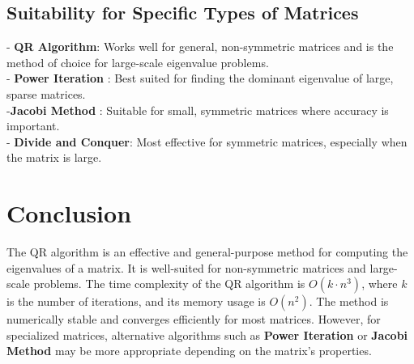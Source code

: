 \documentclass{article}
\begin{document}
\subsection{Suitability for Specific Types of Matrices}
- \textbf{QR Algorithm}: Works well for general, non-symmetric matrices and is the method of choice for large-scale eigenvalue problems.\\
- \textbf{Power Iteration} : Best suited for finding the dominant eigenvalue of large, sparse matrices.\\
-\textbf{Jacobi Method} : Suitable for small, symmetric matrices where accuracy is important.\\
- \textbf{Divide and Conquer}: Most effective for symmetric matrices, especially when the matrix is large.

\section{Conclusion}

The QR algorithm is an effective and general-purpose method for computing the eigenvalues of a matrix. It is well-suited for non-symmetric matrices and large-scale problems. The time complexity of the QR algorithm is \( O(k \cdot n^3) \), where \( k \) is the number of iterations, and its memory usage is \( O(n^2) \). The method is numerically stable and converges efficiently for most matrices. However, for specialized matrices, alternative algorithms such as \textbf{Power Iteration} or \textbf{Jacobi Method} may be more appropriate depending on the matrix's properties.
\end{document}
